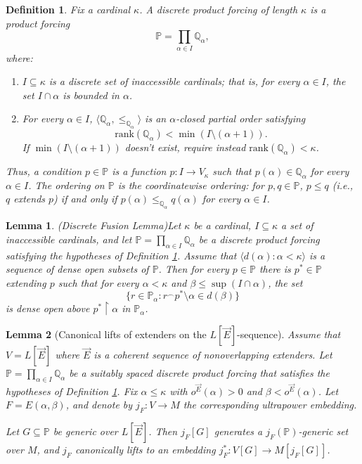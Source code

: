 \documentclass[10pt,a4paper]{amsart}
\newtheorem{definition}{Definition}
\newtheorem{lemma}{Lemma}
\newcommand{\la}{\langle}
\newcommand{\po}{\mathbb{P}}
\newcommand{\qo}{\mathbb{Q}}
\newcommand{\ra}{\rangle}
\newcommand{\uhr}{\upharpoonright}
\begin{document}
\begin{definition}\label{Def:discrete-product-forcings}
Fix a cardinal $\kappa$. A \emph{discrete product forcing} of length $\kappa$ is a product forcing
$$\po=\prod_{\alpha\in I}\qo_\alpha,$$
where:
\begin{enumerate}
    \item $I\subseteq\kappa$ is a discrete set of inaccessible cardinals; that is, for every $\alpha\in I$, the set $I\cap\alpha$ is bounded in $\alpha$.
    
    \item For every $\alpha\in I$, $\langle\qo_\alpha,\leq_{\qo_\alpha}\rangle$ is an $\alpha$-closed partial order satisfying
    \[
    \text{rank}(\qo_\alpha)<\min(I\setminus(\alpha+1)).
    \]
    If $\min(I\setminus (\alpha+1))$ doesn't exist, require instead $\text{rank}(\qo_\alpha)<\kappa$.
\end{enumerate}
Thus, a condition $p\in\po$ is a function $
p:I\to V_\kappa$
 such that $p(\alpha)\in\qo_\alpha$ for every $\alpha\in I$. The ordering on $\po$ is the coordinatewise ordering: for $p,q\in\po$, $
p\leq q$ (i.e., $q$ extends $p$) if and only if $p(\alpha)\leq_{\qo_\alpha} q(\alpha)
$ for every $\alpha\in I$.
\end{definition}

\begin{lemma}{\rm{(Discrete Fusion Lemma)}}\label{Lem:DiscreteFusion}
    Let $\kappa$ be a cardinal, $I\subseteq \kappa$ a set of inaccessible cardinals, and let $\po = \prod_{\alpha\in I}\qo_\alpha$ be a discrete product forcing satisfying the hypotheses of Definition \ref{Def:discrete-product-forcings}. Assume that $\la d(\alpha) \colon \alpha<\kappa \ra$ is a sequence of dense open subsets of $\po$. Then for every $p\in \po$ there is $p^*\in \po$ extending $p$ such that for every $\alpha<\kappa$ and $\beta\leq\sup(I\cap \alpha)$, the set 
    $$ \{ r\in \po_{\alpha} \colon r{}^\frown p^*\setminus \alpha\in d(\beta) \} $$
    is dense open above $p^*\uhr\alpha$ in $\po_{\alpha}$.
\end{lemma}

\begin{lemma}[Canonical lifts of extenders on the {$L[\vec E]$}-sequence]\label{Lem:CanonicalLiftOfAnExtender}
    Assume that $V = L[\vec{E}]$ where $\vec{E}$ is a coherent sequence of nonoverlapping extenders. Let $\po = \prod_{\alpha\in I} \qo_\alpha$ be a suitably spaced discrete product forcing that satisfies the hypotheses of Definition \ref{Def:discrete-product-forcings}.  Fix $\alpha\leq \kappa$ with $o^{\vec E}(\alpha)>0$ and $\beta<o^{\vec E}(\alpha)$. Let $F = E(\alpha,\beta)$, and denote by $j_F\colon V\to M$ the corresponding ultrapower embedding. 
    
    Let $G\subseteq \po$ be generic over $L[\vec E]$. Then $j_F[G]$ generates a $j_F(\po)$-generic set over $M$, and $j_F$ canonically lifts to an embedding $j^*_F\colon V[G]\to M[j_F[G]]$.
    \end{lemma}
\end{document}
